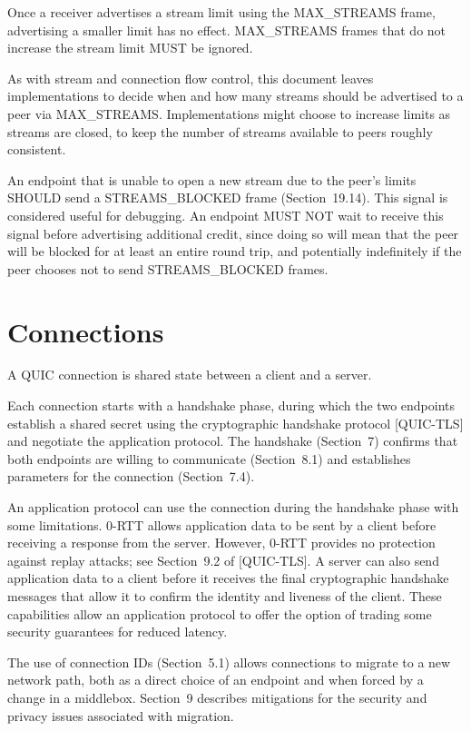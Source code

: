 \documentclass{article}
\begin{document}
Once a receiver advertises a stream limit using the MAX\_STREAMS frame, advertising a smaller limit has no effect.  MAX\_STREAMS frames that do not increase the stream limit MUST be ignored.

As with stream and connection flow control, this document leaves implementations to decide when and how many streams should be advertised to a peer via MAX\_STREAMS.  Implementations might choose to increase limits as streams are closed, to keep the number of streams available to peers roughly consistent.

An endpoint that is unable to open a new stream due to the peer's limits SHOULD send a STREAMS\_BLOCKED frame (Section~19.14).  This signal is considered useful for debugging.  An endpoint MUST NOT wait to receive this signal before advertising additional credit, since doing so will mean that the peer will be blocked for at least an entire round trip, and potentially indefinitely if the peer chooses not to send STREAMS\_BLOCKED frames.

\section{Connections}

A QUIC connection is shared state between a client and a server.

Each connection starts with a handshake phase, during which the two endpoints establish a shared secret using the cryptographic handshake protocol [QUIC-TLS] and negotiate the application protocol.  The handshake (Section~7) confirms that both endpoints are willing to communicate (Section~8.1) and establishes parameters for the connection (Section~7.4).

An application protocol can use the connection during the handshake phase with some limitations.  0-RTT allows application data to be sent by a client before receiving a response from the server. However, 0-RTT provides no protection against replay attacks; see Section~9.2 of [QUIC-TLS].  A server can also send application data to a client before it receives the final cryptographic handshake messages that allow it to confirm the identity and liveness of the client.  These capabilities allow an application protocol to offer the option of trading some security guarantees for reduced latency.

The use of connection IDs (Section~5.1) allows connections to migrate to a new network path, both as a direct choice of an endpoint and when forced by a change in a middlebox.  Section~9 describes mitigations for the security and privacy issues associated with migration.
\end{document}
